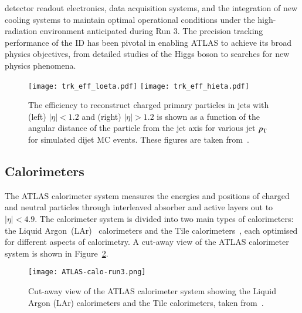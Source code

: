         detector readout electronics, data acquisition systems, and the integration of new cooling systems 
        to maintain optimal operational conditions under the high-radiation environment anticipated during Run 3.
        The precision tracking performance of the ID has been pivotal in enabling ATLAS to achieve its broad 
        physics objectives, from detailed studies of the Higgs boson to searches for new physics phenomena. 
        \begin{figure}[htbp]
            \centering
            \texttt{[image: trk\_eff\_loeta.pdf]}
            \texttt{[image: trk\_eff\_hieta.pdf]}
            \caption{
                The efficiency to reconstruct charged primary particles in jets with (left) $|\eta|< 1.2$ and (right) $|\eta|> 1.2$ is
                shown as a function of the angular distance of the particle from the jet axis for various jet $p_{\text{T}}$ for simulated dijet
                MC events. These figures are taken from~\cite{PERF-2015-08}.
            }
            \label{fig:trk_eff}
        \end{figure}
    \subsection{Calorimeters}
        The ATLAS calorimeter system measures the energies and positions of charged and
        neutral particles through interleaved absorber and active layers out to $|\eta| < 4.9$.
        The calorimeter system is divided into two main types of calorimeters: 
        the Liquid Argon~(LAr)~\cite{ATLAS-TDR-02} calorimeters and the 
        Tile calorimeters~\cite{ATLAS-TDR-03}, each optimised for different aspects of calorimetry.
        A cut-away view of the ATLAS calorimeter system is shown in Figure~\ref{fig:Calo_cutaway}.
        \begin{figure}[htbp]
            \centering
            \texttt{[image: ATLAS-calo-run3.png]}
            \caption{Cut-away view of the ATLAS calorimeter system showing the Liquid Argon (LAr) 
                calorimeters and the Tile calorimeters, taken from~\cite{GENR-2019-02}.}
            \label{fig:Calo_cutaway}
        \end{figure}
